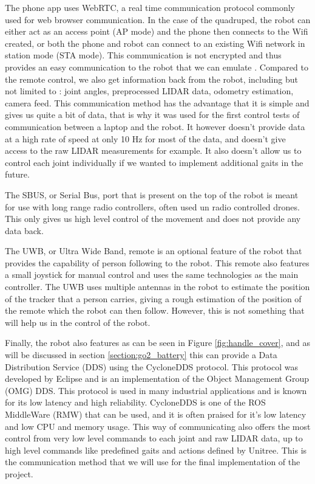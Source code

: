 \documentclass[11pt]{article}
\begin{document}
        The phone app uses WebRTC, a real time communication protocol commonly used for web browser communication. In the case of the quadruped, the robot can either act as an access point (AP mode) and the phone then connects to the Wifi created, or both the phone and robot can connect to an existing Wifi network in station mode (STA mode). This communication is not encrypted and thus provides an easy communication to the robot that we can emulate \cite{go2_webrtc}. Compared to the remote control, we also get information back from the robot, including but not limited to : joint angles, preprocessed LIDAR data, odometry estimation, camera feed. This communication method has the advantage that it is simple and gives us quite a bit of data, that is why it was used for the first control tests of communication between a laptop and the robot. It however doesn't provide data at a high rate of speed at only 10 Hz for most of the data, and doesn't give access to the raw LIDAR measurements for example. It also doesn't allow us to control each joint individually if we wanted to implement additional gaits in the future.

        The SBUS, or Serial Bus, port that is present on the top of the robot is meant for use with long range radio controllers, often used un radio controlled drones. This only gives us high level control of the movement and does not provide any data back.

        The UWB, or Ultra Wide Band, remote is an optional feature of the robot that provides the capability of person following to the robot. This remote also features a small joystick for manual control and uses the same technologies as the main controller. The UWB uses multiple antennas in the robot to estimate the position of the tracker that a person carries, giving a rough estimation of the position of the remote which the robot can then follow. However, this is not something that will help us in the control of the robot.

        Finally, the robot also features as can be seen in Figure \ref{fig:handle_cover}, and as will be discussed in section \ref{section:go2_battery} this can provide a Data Distribution Service (DDS) using the CycloneDDS protocol. This protocol was developed by Eclipse and is an implementation of the Object Management Group (OMG) DDS. This protocol is used in many industrial applications and is known for its low latency and high reliability. CycloneDDS is one of the ROS MiddleWare (RMW) that can be used, and it is often praised for it's low latency and low CPU and memory usage. This way of communicating also offers the most control from very low level commands to each joint and raw LIDAR data, up to high level commands like predefined gaits and actions defined by Unitree. This is the communication method that we will use for the final implementation of the project.
    
\end{document}
